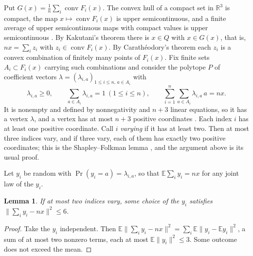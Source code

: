 \documentclass[11pt]{amsart}
\newtheorem{lem}[thm]{Lemma}
\theoremstyle{remark}
\numberwithin{equation}{section}
\newcommand{\E}{\mathbb E}
\DeclareMathOperator{\conv}{conv}
\begin{document}
Put $G(x)=\frac1n\sum_i\conv F_i(x)$. The convex hull of a compact set in $\mathbb R^3$ is compact, the map $x\mapsto\conv F_i(x)$ is upper semicontinuous, and a finite average of upper semicontinuous maps with compact values is upper semicontinuous \cite[Chapter~17]{AliprantisBorder}. By Kakutani's theorem there is $x\in Q$ with $x\in G(x)$, that is, $nx=\sum_iz_i$ with $z_i\in\conv F_i(x)$. By Carath\'eodory's theorem each $z_i$ is a convex combination of finitely many points of $F_i(x)$. Fix finite sets $A_i\subset F_i(x)$ carrying such combinations and consider the polytope $P$ of coefficient vectors $\lambda=(\lambda_{i,a})_{1\le i\le n,\,a\in A_i}$ with
\[
\lambda_{i,a}\ge0,\qquad\sum_{a\in A_i}\lambda_{i,a}=1\ (1\le i\le n),\qquad\sum_{i=1}^n\sum_{a\in A_i}\lambda_{i,a}\,a=nx.
\]
It is nonempty and defined by nonnegativity and $n+3$ linear equations, so it has a vertex $\lambda$, and a vertex has at most $n+3$ positive coordinates \cite[Chapter~2]{BertsimasTsitsiklis}. Each index $i$ has at least one positive coordinate. Call $i$ \emph{varying} if it has at least two. Then at most three indices vary, and if three vary, each of them has exactly two positive coordinates; this is the Shapley--Folkman lemma \cite{Starr69}, and the argument above is its usual proof.

Let $y_i$ be random with $\Pr(y_i=a)=\lambda_{i,a}$, so that $\E\sum_iy_i=nx$ for any joint law of the $y_i$.

\begin{lem}\label{lem:two}
If at most two indices vary, some choice of the $y_i$ satisfies $\|\sum_iy_i-nx\|^2\le6$.
\end{lem}

\begin{proof}
Take the $y_i$ independent. Then $\E\|\sum_iy_i-nx\|^2=\sum_i\E\|y_i-\E y_i\|^2$, a sum of at most two nonzero terms, each at most $\E\|y_i\|^2\le3$. Some outcome does not exceed the mean.
\end{proof}
\end{document}
